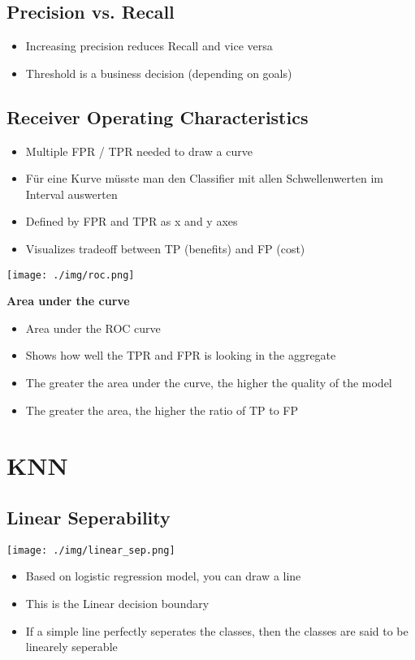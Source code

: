 \subsection{Precision vs. Recall}
\begin{itemize}
    \item Increasing precision reduces Recall and vice versa
    \item Threshold is a business decision (depending on goals)
\end{itemize}

\subsection{Receiver Operating Characteristics}
\begin{itemize}
    \item Multiple FPR / TPR needed to draw a curve
    \item Für eine Kurve müsste man den Classifier mit allen Schwellenwerten im Interval auswerten
    \item Defined by FPR and TPR as x and y axes
    \item Visualizes tradeoff between TP (benefits) and FP (cost)
\end{itemize}
\begin{center}
    \texttt{[image: ./img/roc.png]}
\end{center}
\textbf{Area under the curve}
\begin{itemize}
    \item Area under the ROC curve
    \item Shows how well the TPR and FPR is looking in the aggregate
    \item The greater the area under the curve, the higher the quality of the model
    \item The greater the area, the higher the ratio of TP to FP
\end{itemize}

\section{KNN}
\subsection{Linear Seperability}
\texttt{[image: ./img/linear\_sep.png]}

\begin{itemize}
    \item Based on logistic regression model, you can draw a line
    \item This is the Linear decision boundary
    \item If a simple line perfectly seperates the classes, then the classes are said to be linearely seperable
\end{itemize}

